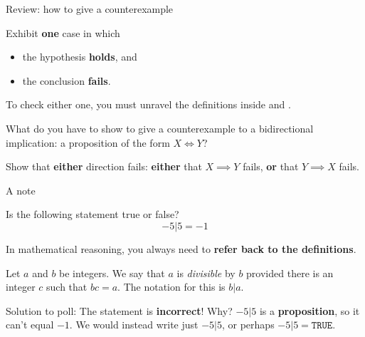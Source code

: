 \documentclass[10pt]{beamer}
\begin{document}
\begin{frame}{Review: how to give a counterexample}

\begin{mygreenbox}[title=Unidirectional implication: $\red{X} \implies \blue{Y}$]
Exhibit \textbf{one} case in which
\begin{itemize}
	\item the hypothesis  \textbf{holds}, and
	\item the conclusion  \textbf{fails}.
\end{itemize}
\vspace{0.2em}
To check either one, you must \alert{unravel the definitions} inside  and .
\end{mygreenbox}

\vfill
\pause

\begin{myyellowbox}[title=Poll]
What do you have to show to give a counterexample to a bidirectional implication:  a proposition of the form $X \iff Y$?
\end{myyellowbox}

\vfill
\pause

\begin{myredbox}[title=Solution]
Show that \alert{\textbf{either}} direction fails: \textbf{either} that
$X \implies Y$ fails, \textbf{or} that $Y \implies X$ fails.

\end{myredbox}

\end{frame}

\begin{frame}{A note}

\begin{myyellowbox}[title=Poll]
Is the following statement true or false? 
\[ -5|5 = -1 \] 
\end{myyellowbox}

\pause 

\begin{myredbox}[title=Alert!]
In mathematical reasoning, you always need to \textbf{refer back to the definitions}.    
\end{myredbox}

\pause 
	\begin{mydef}[title=Reminder of Definition 3.2 (\textbf{Divisible})]
	Let $a$ and $b$ be integers.  We say that $a$ is \textit{divisible} by $b$ provided there is an integer $c$ such that $bc=a$. The notation for this is $b|a$. 
	\end{mydef}
\pause 
\footnotesize 
Solution to poll: The statement is \textbf{incorrect}! Why? \pause $-5|5$ is a \textbf{proposition}, so it can't equal $-1$. We would instead write just $-5|5$, or perhaps $-5|5 = \texttt{TRUE}$. %
\end{frame}
\end{document}

